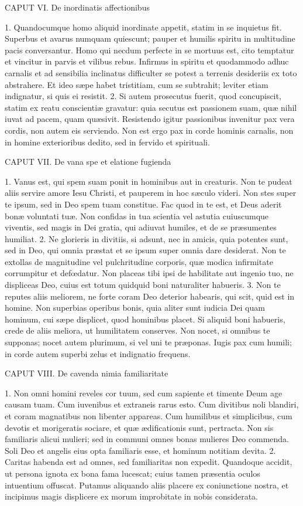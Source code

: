 CAPUT VI.
De inordinatis affectionibus

1. Quandocumque homo aliquid inordinate appetit, statim in se inquietus fit. Superbus et avarus numquam quiescunt; pauper et humilis spiritu in multitudine pacis conversantur. Homo qui necdum perfecte in se mortuus est, cito temptatur et vincitur in parvis et vilibus rebus. Infirmus in spiritu et quodammodo adhuc carnalis et ad sensibilia inclinatus difficulter se potest a terrenis desideriis ex toto abstrahere. Et ideo sæpe habet tristitiam, cum se subtrahit; leviter etiam indignatur, si quis ei resistit.
2. Si autem prosecutus fuerit, quod concupiscit, statim ex reatu conscientiæ gravatur: quia secutus est passionem suam, quæ nihil iuvat ad pacem, quam quæsivit. Resistendo igitur passionibus invenitur pax vera cordis, non autem eis serviendo. Non est ergo pax in corde hominis carnalis, non in homine exterioribus dedito, sed in fervido et spirituali.


CAPUT VII.
De vana spe et elatione fugienda

1. Vanus est, qui spem suam ponit in hominibus aut in creaturis. Non te pudeat aliis servire amore Iesu Christi, et pauperem in hoc sæculo videri. Non stes super te ipsum, sed in Deo spem tuam constitue. Fac quod in te est, et Deus aderit bonæ voluntati tuæ. Non confidas in tua scientia vel astutia cuiuscumque viventis, sed magis in Dei gratia, qui adiuvat humiles, et de se præsumentes humiliat.
2. Ne glorieris in divitiis, si adsunt, nec in amicis, quia potentes sunt, sed in Deo, qui omnia præstat et se ipsum super omnia dare desiderat. Non te extollas de magnitudine vel pulchritudine corporis, quæ modica infirmitate corrumpitur et defœdatur. Non placeas tibi ipsi de habilitate aut ingenio tuo, ne displiceas Deo, cuius est totum quidquid boni naturaliter habueris.
3. Non te reputes aliis meliorem, ne forte coram Deo deterior habearis, qui scit, quid est in homine. Non superbias operibus bonis, quia aliter sunt iudicia Dei quam hominum, cui sæpe displicet, quod hominibus placet. Si aliquid boni habueris, crede de aliis meliora, ut humilitatem conserves. Non nocet, si omnibus te supponas; nocet autem plurimum, si vel uni te præponas. Iugis pax cum humili; in corde autem superbi zelus et indignatio frequens.


CAPUT VIII.
De cavenda nimia familiaritate

1. Non omni homini reveles cor tuum, sed cum sapiente et timente Deum age causam tuam. Cum iuvenibus et extraneis rarus esto. Cum divitibus noli blandiri, et coram magnatibus non libenter appareas. Cum humilibus et simplicibus, cum devotis et morigeratis sociare, et quæ ædificationis sunt, pertracta. Non sis familiaris alicui mulieri; sed in communi omnes bonas mulieres Deo commenda. Soli Deo et angelis eius opta familiaris esse, et hominum notitiam devita.
2. Caritas habenda est ad omnes, sed familiaritas non expedit. Quandoque accidit, ut persona ignota ex bona fama lucescat; cuius tamen præsentia oculos intuentium offuscat. Putamus aliquando aliis placere ex coniunctione nostra, et incipimus magis displicere ex morum improbitate in nobis considerata.


